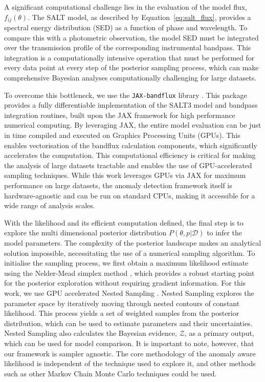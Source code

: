 A significant computational challenge lies in the evaluation of the model flux, $f_{ij}(\theta)$. The SALT model, as described by Equation~\eqref{eq:salt_flux}, provides a spectral energy distribution (SED) as a function of phase and wavelength. To compare this with a photometric observation, the model SED must be integrated over the transmission profile of the corresponding instrumental bandpass. This integration is a computationally intensive operation that must be performed for every data point at every step of the posterior sampling process, which can make comprehensive Bayesian analyses computationally challenging for large datasets.

To overcome this bottleneck, we use the \texttt{JAX-bandflux} library \citep{leeney2025jax}. This package provides a fully differentiable implementation of the SALT3 model and bandpass integration routines, built upon the JAX framework for high performance numerical computing. By leveraging JAX, the entire model evaluation can be just in time compiled and executed on Graphics Processing Units (GPUs). This enables vectorisation of the bandflux calculation components, which significantly accelerates the computation. This computational efficiency is critical for making the analysis of large datasets tractable and enables the use of GPU-accelerated sampling techniques. While this work leverages GPUs via JAX for maximum performance on large datasets, the anomaly detection framework itself is hardware-agnostic and can be run on standard CPUs, making it accessible for a wide range of analysis scales.

With the likelihood and its efficient computation defined, the final step is to explore the multi dimensional posterior distribution $P(\theta, p | \mathcal{D})$ to infer the model parameters. The complexity of the posterior landscape makes an analytical solution impossible, necessitating the use of a numerical sampling algorithm. To initialise the sampling process, we first obtain a maximum likelihood estimate using the Nelder-Mead simplex method \citep{Nelder1965}, which provides a robust starting point for the posterior exploration without requiring gradient information. For this work, we use GPU accelerated Nested Sampling \citep{yallup2025nested}. Nested Sampling explores the parameter space by iteratively moving through nested contours of constant likelihood. This process yields a set of weighted samples from the posterior distribution, which can be used to estimate parameters and their uncertainties. Nested Sampling also calculates the Bayesian evidence, $\mathcal{Z}$, as a primary output, which can be used for model comparison. It is important to note, however, that our framework is sampler agnostic. The core methodology of the anomaly aware likelihood is independent of the technique used to explore it, and other methods such as other Markov Chain Monte Carlo techniques could be used.

